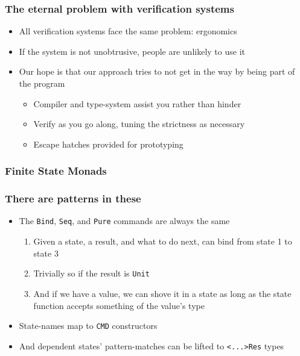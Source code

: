 \documentclass[compress,handout]{beamer}
\begin{document}
\begin{frame}
  \frametitle{The eternal problem with verification systems}

  \begin{itemize}
    \item<1-> All verification systems face the same problem: ergonomics
    \item<2-> If the system is not unobtrusive, people are unlikely to use it
    \item<3-> Our hope is that our approach tries to not get in the way by being
              part of the program
      \begin{itemize}
        \item<4-> Compiler and type-system assist you rather than hinder
        \item<5-> Verify as you go along, tuning the strictness as necessary
        \item<6-> Escape hatches provided for prototyping
      \end{itemize}
  \end{itemize}

\end{frame}


\begin{frame}
  \frametitle{Finite State Monads}

  \vspace*{-3mm}
\end{frame}


\begin{frame}
  \frametitle{There are patterns in these}

  \begin{itemize}
    \item The \texttt{Bind}, \texttt{Seq}, and \texttt{Pure} commands are always
          the same
    \begin{enumerate}
      \item Given a state, a result, and what to do next, can bind from state 1
            to state 3
      \item Trivially so if the result is \texttt{Unit}
      \item And if we have a value, we can shove it in a state as long as the
            state function accepts something of the value's type
    \end{enumerate}
    \item State-names map to \texttt{CMD} constructors
    \item And dependent states' pattern-matches can be lifted to
          \texttt{<...>Res} types
  \end{itemize}

\end{frame}
\end{document}
